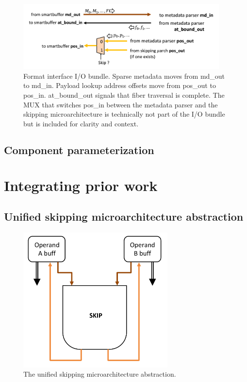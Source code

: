 \begin{figure}[ht]
    \centering
    \includegraphics[width=0.95\textwidth]{figures/format_interface.png}
    \caption{Format interface I/O bundle. Sparse metadata moves from md\_out to md\_in. Payload lookup address offsets move from pos\_out to pos\_in. at\_bound\_out signals that fiber traversal is complete. The MUX that switches pos\_in between the metadata parser and the skipping microarchitecture is technically not part of the I/O bundle but is included for clarity and context.}
    \label{fig:format_interface}
\end{figure}

\subsection{Component parameterization}



\section{Integrating prior work}

\subsection{Unified skipping microarchitecture abstraction}

\begin{figure}[ht]
    \centering
    \includegraphics[width=0.7\textwidth]{figures/uniform_skip_topo.pdf}
    \caption{The unified skipping microarchitecture abstraction.}
    \label{fig:uniform_skip_topo}
\end{figure}

